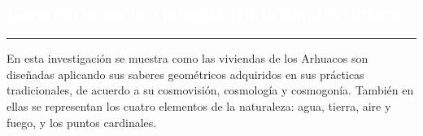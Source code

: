 \pagecolor{white}
\pagestyle{eimat}
\begin{titlepage}
\pagecolor{white}
\newcommand{\R}{\ensuremath{\mathbb{R}}}
\BgThispage
{}
\vspace*{-1.1cm}
\noindent
\def\titulo#1{\section{#1}}

\section{\bf\large\textcolor{white}{Geometr\'ia en la vivienda tradicional Arhuaca}}
\vspace*{2cm}\par
\noindent

\begin{minipage}{0.5\linewidth}
\begin{minipage}{0.45\linewidth}
    \begin{flushright}
        \printauthor
    \end{flushright}
\end{minipage} \hspace{-3pt}
%
\begin{minipage}{0.02\linewidth}
   \color{ptctitle} \rule{1pt}{245pt}
\end{minipage} 
\end{minipage}
\hspace*{-4.5cm}
\begin{minipage}{0.85\linewidth}
\begin{minipage}{0.85\linewidth}
\footnotesize
\vspace{5pt}
    \begin{resumen}
   En esta investigaci\'on se muestra como las viviendas de los Arhuacos son dise\~nadas aplicando sus saberes geom\'etricos adquiridos en sus pr\'acticas tradicionales, de acuerdo a su cosmovisi\'on, cosmolog\'ia y cosmogon\'ia. Tambi\'en  en ellas se representan los cuatro elementos de la naturaleza: agua, tierra, aire y fuego, y los puntos cardinales.
     \end{resumen}
\end{minipage}
\vspace*{5pt}\\
\footnotesize
%  
    

\end{minipage}
\end{titlepage}
